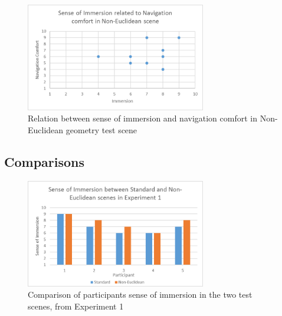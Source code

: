			\begin{figure}[H]
				\includegraphics[width=0.7\textwidth]{Images/NE_Relation}
				\centering
				\caption{Relation between sense of immersion and navigation comfort in Non-Euclidean geometry test scene}
				\label{exp:fig:ne_relation}
			\end{figure}

		\subsection{Comparisons}
		\label{exp:exp:comp}


			\begin{figure}[H]
				\includegraphics[width=0.7\textwidth]{Images/Compare_Immersion_Exp_1}
				\centering
				\caption{Comparison of participants sense of immersion in the two test scenes, from Experiment 1}
				\label{exp:fig:compare_immersion_exp1}
			\end{figure}

